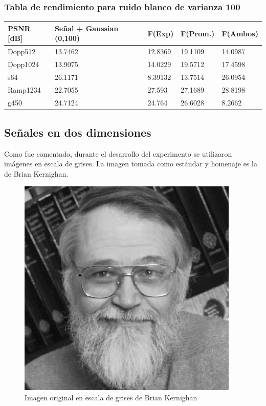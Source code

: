 \subsubsection{Tabla de rendimiento para ruido blanco de varianza 100}

\begin{table}[H]
        \begin{tabular}{|l|llll|}
                \hline
                \textbf{PSNR [dB]} & Se\~nal + Gaussian (0,100) & F(Exp) & F(Prom.) & F(Ambos) \\ \hline
                    Dopp512 & 13.7462 & 12.8369 & 19.1109 & 14.0987 \\
                    Dopp1024 & 13.9075 & 14.0229 & 19.5712 & 17.4598 \\
                    s64 & 26.1171 & 8.39132 & 13.7514 & 26.0954 \\
                    Ramp1234 & 22.7055 & 27.593 & 27.1689 & 28.8198 \\
                    g450 & 24.7124 & 24.764 & 26.6028 & 8.2662 \\ \hline
                    \end{tabular}
                \end{table}




        \subsection{Se\~nales en dos dimensiones}

Como fue comentado, durante el desarrollo del experimento se utilizaron
im\'agenes en escala de grises. La imagen tomada como est\'andar y homenaje es 
la de Brian Kernighan.

\begin{figure}[H]
\begin {center}
\includegraphics[width=299pt]{imagenes/brian_kernighan.png}
\end {center}
\caption{Imagen original en escala de grises de Brian Kernighan}
\label{fig:SinProm}
\end{figure}

